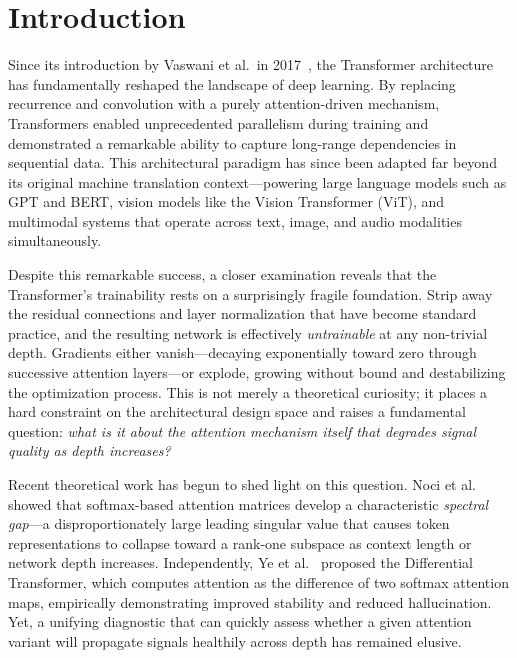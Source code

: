 \documentclass[12pt, a4paper]{article}
\begin{document}
\newpage
\tableofcontents
\newpage

\section{Introduction}

Since its introduction by Vaswani et al.\ in 2017~\cite{vaswani2017}, the
Transformer architecture has fundamentally reshaped the landscape of deep
learning. By replacing recurrence and convolution with a purely
attention-driven mechanism, Transformers enabled unprecedented parallelism
during training and demonstrated a remarkable ability to capture long-range
dependencies in sequential data. This architectural paradigm has since been
adapted far beyond its original machine translation context---powering large
language models such as GPT and BERT, vision models like the Vision
Transformer (ViT), and multimodal systems that operate across text, image,
and audio modalities simultaneously.

Despite this remarkable success, a closer examination reveals that the
Transformer's trainability rests on a surprisingly fragile foundation.
Strip away the residual connections and layer normalization that have become
standard practice, and the resulting network is effectively \textit{untrainable}
at any non-trivial depth. Gradients either vanish---decaying exponentially
toward zero through successive attention layers---or explode, growing without
bound and destabilizing the optimization process. This is not merely a
theoretical curiosity; it places a hard constraint on the architectural
design space and raises a fundamental question: \textit{what is it about the
attention mechanism itself that degrades signal quality as depth increases?}

Recent theoretical work has begun to shed light on this question.
Noci et al.~\cite{mind_the_gap} showed that softmax-based attention matrices
develop a characteristic \textit{spectral gap}---a disproportionately large
leading singular value that causes token representations to collapse toward a
rank-one subspace as context length or network depth increases. Independently,
Ye et al.~\cite{diff_transformer} proposed the Differential Transformer,
which computes attention as the difference of two softmax attention maps,
empirically demonstrating improved stability and reduced hallucination. Yet,
a unifying diagnostic that can quickly assess whether a given attention variant
will propagate signals healthily across depth has remained elusive.
\end{document}
